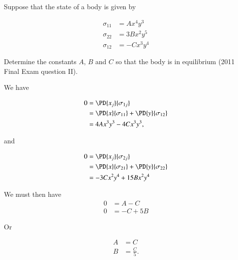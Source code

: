 \begin{Exercise}[title={Equilibrium}, label={problem:elastic:displacements:exampractiseEquilibrium}]
Suppose that the state of a body is given by

\begin{equation}\label{eqn:continuumFluidsReviewXX:3130}
\begin{aligned}
\sigma_{11} &= A x^4 y^3 \\
\sigma_{22} &= 3 B x^2 y^5 \\
\sigma_{12} &= -C x^3 y^4
\end{aligned}
\end{equation}

Determine the constants $A$, $B$ and $C$ so that the body is in equilibrium (2011 Final Exam question II).
\end{Exercise}
\begin{Answer}[ref={problem:elastic:displacements:exampractiseEquilibrium}]
  We have

\begin{equation}\label{eqn:continuumFluidsReviewXX:3150}
\begin{aligned}
0 
&= \PD{x_j}{\sigma_{1j}} \\
&= 
\PD{x}{\sigma_{11}} + \PD{y}{\sigma_{12}} \\
&= 4 A x^3 y^3 - 4 C x^3 y^3,
\end{aligned}
\end{equation}

and

\begin{equation}\label{eqn:continuumFluidsReviewXX:3170}
\begin{aligned}
0 
&= \PD{x_j}{\sigma_{2j}} \\
&= 
\PD{x}{\sigma_{21}} + \PD{y}{\sigma_{22}} \\
&= -3 C x^2 y^4 + 15 B x^2 y^4
\end{aligned}
\end{equation}

We must then have
\begin{equation}\label{eqn:continuumFluidsReviewXX:3190}
\begin{aligned}
0 &= A - C \\
0 &= -C + 5 B
\end{aligned}
\end{equation} 

Or

\begin{equation}\label{eqn:continuumFluidsReviewXX:3210}
\begin{aligned}
A &= C \\
B &= \frac{C}{5}.
\end{aligned}
\end{equation}
\end{Answer}

